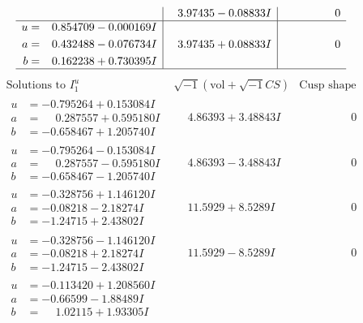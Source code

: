 \documentclass[1p]{elsarticle_modified}
\theoremstyle{definition}
\newcommand{\I}{\sqrt{-1}}
\begin{document}
$$\begin{array}{c|c|c}
 & \phantom{-}3.97435 - 0.08833 I & \phantom{-0.000000 } 0 \\ \hline\begin{aligned}
u &= \phantom{-}0.854709 - 0.000169 I \\
a &= \phantom{-}0.432488 - 0.076734 I \\
b &= \phantom{-}0.162238 + 0.730395 I\end{aligned}
 & \phantom{-}3.97435 + 0.08833 I & \phantom{-0.000000 } 0\\
 \hline 
 \end{array}$$\newpage$$\begin{array}{c|c|c}  
\text{Solutions to }I^u_{1}& \I (\text{vol} + \sqrt{-1}CS) & \text{Cusp shape}\\
 \hline 
\begin{aligned}
u &= -0.795264 + 0.153084 I \\
a &= \phantom{-}0.287557 + 0.595180 I \\
b &= -0.658467 + 1.205740 I\end{aligned}
 & \phantom{-}4.86393 + 3.48843 I & \phantom{-0.000000 } 0 \\ \hline\begin{aligned}
u &= -0.795264 - 0.153084 I \\
a &= \phantom{-}0.287557 - 0.595180 I \\
b &= -0.658467 - 1.205740 I\end{aligned}
 & \phantom{-}4.86393 - 3.48843 I & \phantom{-0.000000 } 0 \\ \hline\begin{aligned}
u &= -0.328756 + 1.146120 I \\
a &= -0.08218 - 2.18274 I \\
b &= -1.24715 + 2.43802 I\end{aligned}
 & \phantom{-}11.5929 + 8.5289 I & \phantom{-0.000000 } 0 \\ \hline\begin{aligned}
u &= -0.328756 - 1.146120 I \\
a &= -0.08218 + 2.18274 I \\
b &= -1.24715 - 2.43802 I\end{aligned}
 & \phantom{-}11.5929 - 8.5289 I & \phantom{-0.000000 } 0 \\ \hline\begin{aligned}
u &= -0.113420 + 1.208560 I \\
a &= -0.66599 - 1.88489 I \\
b &= \phantom{-}1.02115 + 1.93305 I\end{aligned}

\end{array}$$
\end{document}
